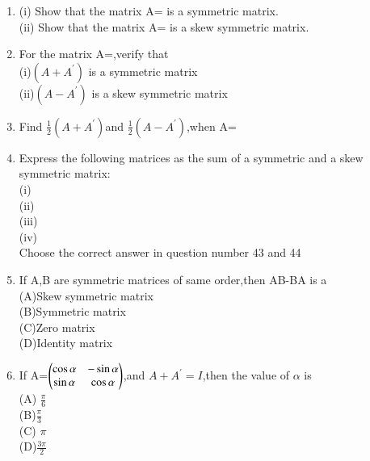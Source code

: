 \begin{enumerate}[label=\arabic*.,ref=\thesubsection.\theenumi]
  \item (i) Show that the matrix A= is a symmetric matrix.\\
  (ii) Show that the matrix A= is a skew symmetric matrix.\\
  \item For the matrix A=,verify that\\
  (i)$(A+A^{'})$ is a symmetric matrix\\
  (ii)$(A-A^{'})$ is a skew symmetric matrix\\
  
  \item Find $\frac{1}{2}(A+A^{'}) $and $\frac{1}{2}(A-A^{'})$,when A=\\
  \item Express the following matrices as the sum of a symmetric and a skew symmetric matrix:\\
  (i)  \\(ii)  \\
  (iii) \\ (iv) \\
  
  Choose the correct answer in question number 43 and 44\\
  \item If A,B are symmetric matrices of same order,then AB-BA is a\\
  (A)Skew symmetric matrix \\(B)Symmetric matrix\\
  (C)Zero matrix \\ (D)Identity matrix\\
  \item If A=$\begin{pmatrix}\cos\alpha &-\sin\alpha\\ \sin\alpha &\cos\alpha\end{pmatrix}$,and $A+A^{'}=I$,then the value of $\alpha$ is\\
  (A) $\frac{\pi}{6}$\\ (B)$\frac{\pi}{3}$ \\
  (C) $\pi$ \\ (D)$\frac{3\pi}{2}$\\
  

\end{enumerate}
